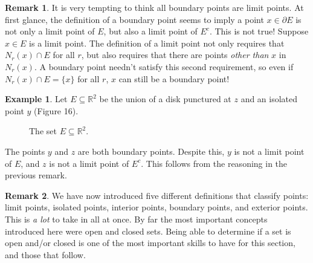 \documentclass{article}
\newcommand{\R}{\mathbb{R}}
\theoremstyle{definition}
\newtheorem{example}{Example}[section]
\newtheorem{remark}{Remark}[section]
\begin{document}
	\begin{remark}
		It is very tempting to think all boundary points are limit points. At first glance, the definition of a boundary point seems to imply a point $ x\in\partial E $ is not only a limit point of $ E $, but also a limit point of $ E^c $. This is not true! Suppose $ x\in E $ is a limit point. The definition of a limit point not only requires that $ N_r(x)\cap E $ for all $ r $, but also requires that there are points \textit{other than} $ x $ in $ N_r(x) $. A boundary point needn't satisfy this second requirement, so even if $ N_r(x)\cap E=\{x\} $ for all $ r $, $ x $ can still be a boundary point! 
	\end{remark}
	
	\begin{example}
		Let $ E\subseteq \R^2 $ be the union of a disk punctured at $ z $ and an isolated point $ y $ (Figure 16).  
		\begin{figure}[h]
			\centering
			\caption{The set $ E\subseteq \R^2 $.}
		\end{figure}
		
		The points $ y $ and $ z $ are both boundary points. Despite this, $ y $ is not a limit point of $ E $, and $ z $ is not a limit point of $ E^c $. This follows from the reasoning in the previous remark.  	
	\end{example}
	
	\begin{remark}
		We have now introduced five different definitions that classify points: limit points, isolated points, interior points, boundary points, and exterior points. This is \textit{a lot} to take in all at once. By far the most important concepts introduced here were open and closed sets. Being able to determine if a set is open and/or closed is one of the most important skills to have for this section, and those that follow. 
	\end{remark}
\end{document}
